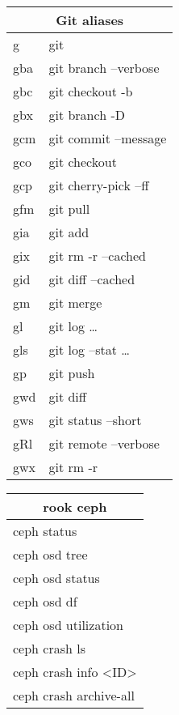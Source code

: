 \documentclass[12pt,paper=landscape,paper=a4]{scrartcl}
\begin{document}
\pagestyle{empty}

\begin{multicols}{3}

    \begin{tabular}{ll}
        \multicolumn{2}{c}{Git aliases} \\
        \hline
        g    & git\\
        gba  & git branch --verbose\\
        gbc  & git checkout -b\\
        gbx  & git branch -D\\
        gcm  & git commit --message\\
        gco  & git checkout\\
        gcp  & git cherry-pick --ff\\
        gfm  & git pull\\
        gia  & git add\\
        gix  & git rm -r --cached\\
        gid  & git diff --cached\\
        gm   & git merge\\
        gl   & git log \ldots\\
        gls  & git log --stat \ldots\\
        gp   & git push\\
        gwd  & git diff\\
        gws  & git status --short\\
        gRl  & git remote --verbose\\
        gwx  & git rm -r
    \end{tabular}

    \vspace{1em}

    \begin{tabular}{l}
        \multicolumn{1}{c}{rook ceph}\\
        \hline
        ceph status\\
        ceph osd tree\\
        ceph osd status\\
        ceph osd df\\
        ceph osd utilization\\
        ceph crash ls\\
        ceph crash info \textless{}ID\textgreater\\
        ceph crash archive-all\\
    \end{tabular}


\end{multicols}
\end{document}
